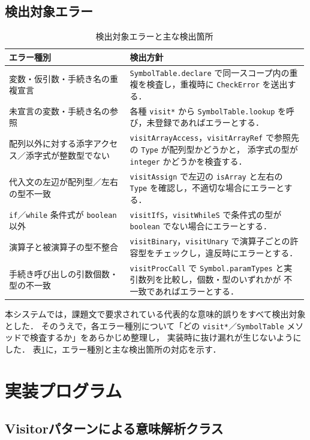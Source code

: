 \documentclass[a4j,10pt]{jarticle}
\begin{document}
\subsection{検出対象エラー}
\begin{table}[htbp]
  \centering
  \caption{検出対象エラーと主な検出箇所}
  \label{tab:errors}
  \begin{tabular}{p{0.40\linewidth}p{0.59\linewidth}}
    \toprule
    エラー種別 & 検出方針 \\ \midrule
    変数・仮引数・手続き名の重複宣言 &
      \verb|SymbolTable.declare| で同一スコープ内の重複を検査し，重複時に \verb|CheckError| を送出する． \\
    未宣言の変数・手続き名の参照 &
      各種 \verb|visit*| から \verb|SymbolTable.lookup| を呼び，未登録であればエラーとする． \\
    配列以外に対する添字アクセス／添字式が整数型でない &
      \verb|visitArrayAccess|，\verb|visitArrayRef| で参照先の \verb|Type| が配列型かどうかと，
      添字式の型が \verb|integer| かどうかを検査する． \\
    代入文の左辺が配列型／左右の型不一致 &
      \verb|visitAssign| で左辺の \verb|isArray| と左右の \verb|Type| を確認し，不適切な場合にエラーとする． \\
    \verb|if|／\verb|while| 条件式が \verb|boolean| 以外 &
      \verb|visitIfS|，\verb|visitWhileS| で条件式の型が \verb|boolean| でない場合にエラーとする． \\
    演算子と被演算子の型不整合 &
      \verb|visitBinary|，\verb|visitUnary| で演算子ごとの許容型をチェックし，違反時にエラーとする． \\
    手続き呼び出しの引数個数・型の不一致 &
      \verb|visitProcCall| で \verb|Symbol.paramTypes| と実引数列を比較し，個数・型のいずれかが
      不一致であればエラーとする． \\
    \bottomrule
  \end{tabular}
\end{table}
本システムでは，課題文で要求されている代表的な意味的誤りをすべて検出対象とした．
そのうえで，各エラー種別について「どの \verb|visit*|／\verb|SymbolTable| メソッドで検査するか」をあらかじめ整理し，
実装時に抜け漏れが生じないようにした．
表\ref{tab:errors}に，エラー種別と主な検出箇所の対応を示す．

\section{実装プログラム}
\subsection{Visitorパターンによる意味解析クラス}
\end{document}
